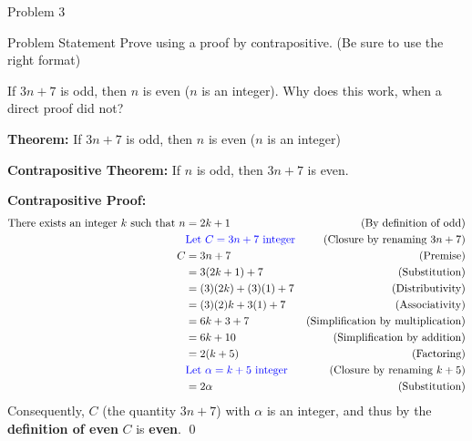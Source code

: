 \begin{problem}{Problem 3}
    \begin{statement}{Problem Statement}
        Prove using a proof by contrapositive. (Be sure to use the right format) \vspace*{1em}

        If $3n + 7$ is odd, then $n$ is even ($n$ is an integer). Why does this work, when a direct proof did not?
    \end{statement}

    \begin{highlight}[Solution]
        \textbf{Theorem:} If $3n + 7$ is odd, then $n$ is even ($n$ is an integer) \vspace*{1em}

        \textbf{Contrapositive Theorem:} If $n$ is odd, then $3n + 7$ is even. \vspace*{1em}

        \textbf{Contrapositive Proof:} \newline
        \begin{align*}
            \text{There exists an integer $k$ such that } n & = 2k + 1 & \text{(By definition of odd)} \\
            & \textcolor{blue}{\text{Let } C = 3n + 7 \text{ integer}} & \text{(Closure by renaming $3n + 7$)} \\
            C & = 3n + 7 & \text{(Premise)} \\
            & = 3(2k + 1) + 7 & \text{(Substitution)} \\
            & = (3)(2k) + (3)(1) + 7 & \text{(Distributivity)} \\
            & = (3)(2)k + 3(1) + 7 & \text{(Associativity)} \\
            & = 6k + 3 + 7 & \text{(Simplification by multiplication)} \\
            & = 6k + 10 & \text{(Simplification by addition)} \\
            & = 2(k + 5) & \text{(Factoring)} \\
            & \textcolor{blue}{\text{Let } \alpha = k + 5 \text{ integer}} & \text{(Closure by renaming $k + 5$)} \\
            & = 2\alpha & \text{(Substitution)} \\
        \end{align*}
        Consequently, $C$ (the quantity $3n + 7$) with $\alpha$ is an integer, and thus by the \textbf{definition of even} $C$ is \textbf{even}. \qed
    \end{highlight}


\end{problem}
